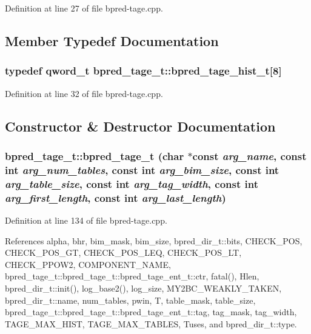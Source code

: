 Definition at line 27 of file bpred-tage.cpp.

\subsection{Member Typedef Documentation}
\subsubsection[{bpred\_\-tage\_\-hist\_\-t}]{\setlength{\rightskip}{0pt plus 5cm}typedef qword\_\-t {\bf bpred\_\-tage\_\-t::bpred\_\-tage\_\-hist\_\-t}[8]\hspace{0.3cm}{\tt  [private]}}\label{classbpred__tage__t_ad5e93e5a810dccf7d9c03e862e9602c}




Definition at line 32 of file bpred-tage.cpp.

\subsection{Constructor \& Destructor Documentation}
\subsubsection[{bpred\_\-tage\_\-t}]{\setlength{\rightskip}{0pt plus 5cm}bpred\_\-tage\_\-t::bpred\_\-tage\_\-t (char $\ast$const  {\em arg\_\-name}, \/  const int {\em arg\_\-num\_\-tables}, \/  const int {\em arg\_\-bim\_\-size}, \/  const int {\em arg\_\-table\_\-size}, \/  const int {\em arg\_\-tag\_\-width}, \/  const int {\em arg\_\-first\_\-length}, \/  const int {\em arg\_\-last\_\-length})\hspace{0.3cm}{\tt  [inline]}}\label{classbpred__tage__t_b60803d0e744c26d90e915a5afab9530}




Definition at line 134 of file bpred-tage.cpp.

References alpha, bhr, bim\_\-mask, bim\_\-size, bpred\_\-dir\_\-t::bits, CHECK\_\-POS, CHECK\_\-POS\_\-GT, CHECK\_\-POS\_\-LEQ, CHECK\_\-POS\_\-LT, CHECK\_\-PPOW2, COMPONENT\_\-NAME, bpred\_\-tage\_\-t::bpred\_\-tage\_\-t::bpred\_\-tage\_\-ent\_\-t::ctr, fatal(), Hlen, bpred\_\-dir\_\-t::init(), log\_\-base2(), log\_\-size, MY2BC\_\-WEAKLY\_\-TAKEN, bpred\_\-dir\_\-t::name, num\_\-tables, pwin, T, table\_\-mask, table\_\-size, bpred\_\-tage\_\-t::bpred\_\-tage\_\-t::bpred\_\-tage\_\-ent\_\-t::tag, tag\_\-mask, tag\_\-width, TAGE\_\-MAX\_\-HIST, TAGE\_\-MAX\_\-TABLES, Tuses, and bpred\_\-dir\_\-t::type.
